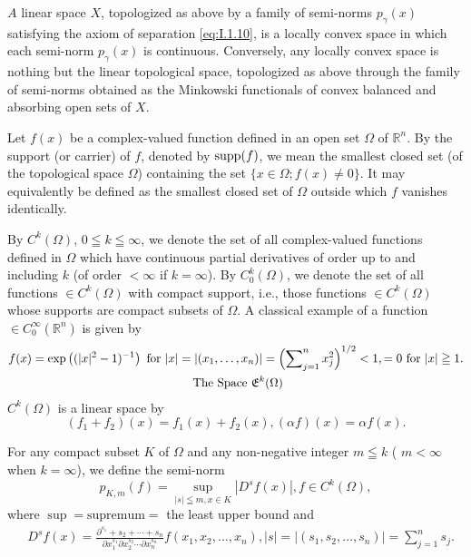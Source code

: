 \begin{theoremu} $A$ linear space $X$, topologized as above by a family of semi-norms $p_{\gamma}(x)$ satisfying the axiom of separation \eqref{eq:I.1.10}, is a locally convex space in which each semi-norm $p_{\gamma}(x)$ is continuous. Conversely, any locally convex space is nothing but the linear topological space, topologized as above through the family of semi-norms obtained as the Minkowski functionals of convex balanced and absorbing open sets of $X$. 
\end{theoremu}

\begin{definition}\label{def:I.1.Definition.4} Let $f(x)$ be a complex-valued function defined in an open set $\Omega$ of $\mathbb{R}^{n}$. By the support (or carrier) of $f$, denoted by $\supp(f)$, we mean the smallest closed set (of the topological space $\Omega$) containing the set $\{x \in \Omega; f(x) \neq 0\}$. It may equivalently be defined as the smallest closed set of $\Omega$ outside which $f$ vanishes identically. 
\end{definition}

\begin{definition}\label{def:I.1.Definition.5} By $C^k(\Omega)$, $0 \leqq k \leqq \infty$, we denote the set of all complex-valued functions defined in $\Omega$ which have continuous partial derivatives of order up to and including $k$ (of order $< \infty$ if $k = \infty$). By $C_0^k(\Omega)$, we denote the set of all functions $\in C^k(\Omega)$ with compact support, i.e., those functions $\in C^k(\Omega)$ whose supports are compact subsets of $\Omega$. A classical example of a function $\in C_0^\infty(\mathbb{R}^{n})$ is given by 
\begin{gather}f (x) = \exp\left((| x | ^{2}- 1) ^{-1}\right) \text{ for } | x | = | (x_{1}, \dots , x_{n}) | = \left(\sum\limits_{j=1} ^{n} x_{j} ^{2}\right) ^{1/2} < 1, = 0 \text{ for } | x | \geqq 1. \label{eq:I.1.14}
\\\text{ The Space } \mathfrak {E} ^{k} (\Omega) \notag
\end{gather}
$C^k (\Omega)$ is a linear space by 
\[
\left(f_{1} + f_{2}\right) (x) = f_{1} (x) + f_{2} (x), (\alpha f) (x) = \alpha f (x).
\]
\end{definition}

For any compact subset $K$ of $\Omega$ and any non-negative integer $m \leqq k$ ( $m < \infty$ when $k = \infty$), we define the semi-norm 
\[
p_{K,m} (f) = \sup\limits_{| s | \leqq m, x \in K} | D ^{s} f (x) |, f \in C ^{k} (\Omega),
\]
where $\sup= \text{supremum} =$ the least upper bound and 
\[
\begin{aligned}
&D ^{s} f (x) = \frac {\partial^ {s_{1}} + s_{2} + \cdots + s_{n}}{\partial x_{1} ^ {s_{1}} \partial x_{2} ^ {s_{2}} \cdots \partial x_{n} ^ {s_{n}}} f (x_{1}, x_{2}, \dots , x_{n}), | s | = | (s_{1}, s_{2}, \dots , s_{n}) | = \sum\limits_{j=1} ^{n} s_{j}.
\end{aligned}
\]

